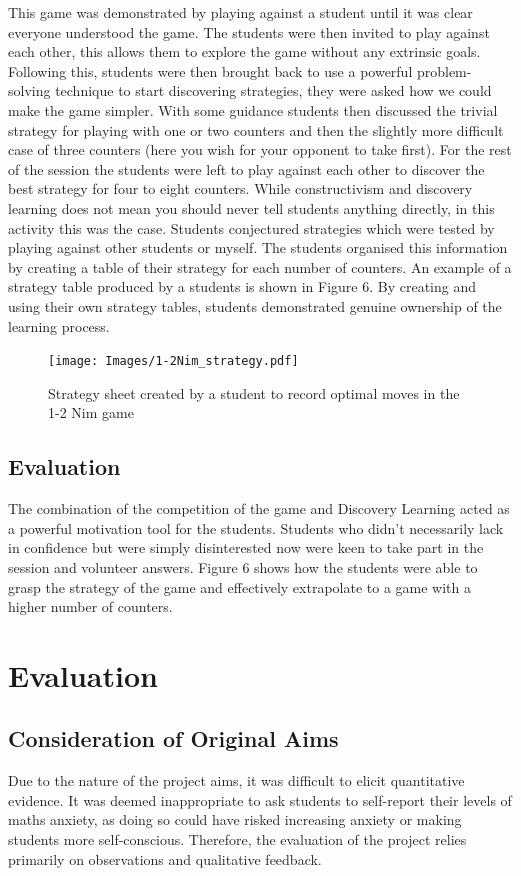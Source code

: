 \documentclass[11pt, a4paper, notitlepage]{article}
\begin{document}
This game was demonstrated by playing against a student until it was clear everyone understood the game. The students were then invited to play against each other, this allows them to explore the game without any extrinsic goals. Following this, students were then brought back to use a powerful problem-solving technique to start discovering strategies, they were asked how we could make the game simpler. With some guidance students then discussed the trivial strategy for playing with one or two counters and then the slightly more difficult case of three counters (here you wish for your opponent to take first). For the rest of the session the students were left to play against each other to discover the best strategy for four to eight counters. While constructivism and discovery learning does not mean you should never tell students anything directly, in this activity this was the case. Students conjectured strategies which were tested by playing against other students or myself. The students organised this information by creating a table of their strategy for each number of counters. An example of a strategy table produced by a students is shown in Figure 6. By creating and using their own strategy tables, students demonstrated genuine ownership of the learning process.

\begin{figure}[htbp]
    \centering
    \texttt{[image: Images/1-2Nim\_strategy.pdf]}
    \caption{Strategy sheet created by a student to record optimal moves in the 1-2 Nim game}
\end{figure}

\subsection*{Evaluation}
The combination of the competition of the game and Discovery Learning acted as a powerful motivation tool for the students. Students who didn't necessarily lack in confidence but were simply disinterested now were keen to take part in the session and  volunteer answers. Figure 6 shows how the students were able to grasp the strategy of the game and effectively extrapolate to a game with a higher number of counters.
\section{Evaluation}

\subsection{Consideration of Original Aims}
Due to the nature of the project aims, it was difficult to elicit quantitative evidence. It was deemed inappropriate to ask students to self-report their levels of maths anxiety, as doing so could have risked increasing anxiety or making students more self-conscious. Therefore, the evaluation of the project relies primarily on observations and qualitative feedback.
\end{document}
